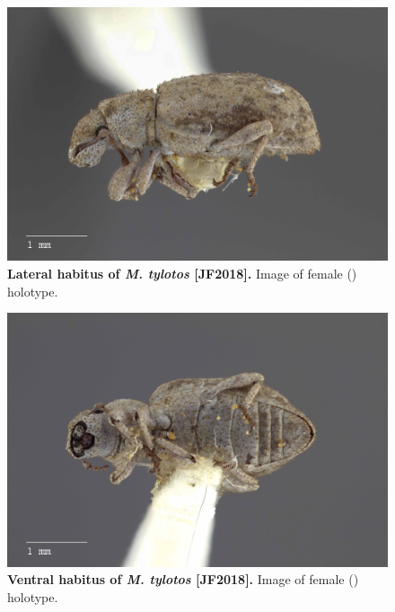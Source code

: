 \documentclass[fleqn,10pt,lineno]{wlpeerj} %
\begin{document}
\begin{figure}[h]
	\begin{sideways}
		\centering
		\includegraphics[height=\textwidth]{figure31.jpg}
	\end{sideways}
	\caption{\textbf{Lateral habitus of \textit{M. tylotos} [JF2018].} Image of female (\female) holotype.}
	\label{fig:tylotos_F_lateral}
\end{figure}

\begin{figure}[h]
	\begin{sideways}
		\centering
		\includegraphics[height=\textwidth]{figure32.jpg}
	\end{sideways}
	\caption{\textbf{Ventral habitus of \textit{M. tylotos} [JF2018].} Image of female (\female) holotype.}
	\label{fig:tylotos_F_ventral}
\end{figure}
\end{document}
